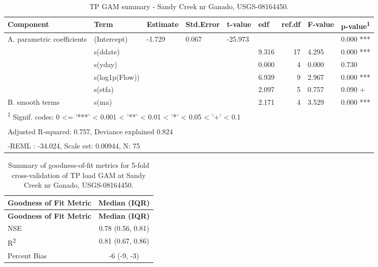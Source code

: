 \documentclass[
]{article}
\newenvironment{widestuff}{\begin{table}[h]\begin{adjustwidth}{-4.5cm}{-4.5cm}\centering}{\end{adjustwidth}\end{table}}
\begin{document}
\begin{widestuff}

\caption{TP GAM summary - Sandy Creek nr Ganado, USGS-08164450.}
\centering
\begin{tabular}[t]{llllllrll}
\toprule
Component & Term & Estimate & Std.Error & t-value & edf & ref.df & F-value & p-value\textsuperscript{1}\\
\midrule
A. parametric coefficients & (Intercept) & -1.729 & 0.067 & -25.973 &  &  &  & 0.000 ***\\
\cmidrule{1-9}
 & s(ddate) &  &  &  & 9.316 & 17 & 4.295 & 0.000 ***\\

 & s(yday) &  &  &  & 0.000 & 4 & 0.000 & 0.730\\

 & s(log1p(Flow)) &  &  &  & 6.939 & 9 & 2.967 & 0.000 ***\\

 & s(stfa) &  &  &  & 2.097 & 5 & 0.757 & 0.090 +\\

\multirow[t]{-5}{*}{\raggedright\arraybackslash B. smooth terms} & s(ma) &  &  &  & 2.171 & 4 & 3.529 & 0.000 ***\\
\bottomrule
\multicolumn{9}{l}{\textsuperscript{1} Signif. codes: 0 <= '***' < 0.001 < '**' < 0.01 < '*' < 0.05 < '+' < 0.1}\\
\multicolumn{9}{l}{\textsuperscript{} Adjusted R-squared: 0.757, Deviance explained 0.824}\\
\multicolumn{9}{l}{\textsuperscript{} -REML : -34.024, Scale est: 0.00944, N: 75}\\
\end{tabular}
\end{widestuff}

\hypertarget{tbl-TP08164450-CV}{}
\begin{longtable}[]{@{}lc@{}}
\caption{\label{tbl-TP08164450-CV}Summary of goodness-of-fit metrics for
5-fold cross-validation of TP load GAM at Sandy Creek nr Ganado,
USGS-08164450.}\tabularnewline
\toprule()
\textbf{Goodness of Fit Metric} & \textbf{Median (IQR)} \\
\midrule()
\endfirsthead
\toprule()
\textbf{Goodness of Fit Metric} & \textbf{Median (IQR)} \\
\midrule()
\endhead
NSE & 0.78 (0.56, 0.81) \\
R\textsuperscript{2} & 0.81 (0.67, 0.86) \\
Percent Bias & -6 (-9, -3) \\
\bottomrule()
\end{longtable}
\end{document}
